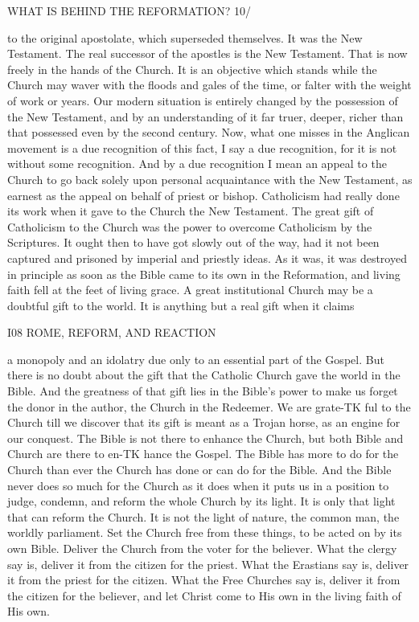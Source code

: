 \documentclass[12pt,a5paper,twoside]{book}
\begin{document}
WHAT IS BEHIND THE REFORMATION? 10/ 

to the original apostolate, which superseded themselves. 
It was the New Testament. The real successor of the 
apostles is the New Testament. That is now freely in 
the hands of the Church. It is an objective which 
stands while the Church may waver with the floods 
and gales of the time, or falter with the weight of 
work or years. Our modern situation is entirely 
changed by the possession of the New Testament, 
and by an understanding of it far truer, deeper, richer 
than that possessed even by the second century. 
Now, what one misses in the Anglican movement is a 
due recognition of this fact, I say a due recognition, 
for it is not without some recognition. And by a due 
recognition I mean an appeal to the Church to go 
back solely upon personal acquaintance with the New 
Testament, as earnest as the appeal on behalf of priest 
or bishop. Catholicism had really done its work 
when it gave to the Church the New Testament. The 
great gift of Catholicism to the Church was the power 
to overcome Catholicism by the Scriptures. It ought 
then to have got slowly out of the way, had it not been 
captured and prisoned by imperial and priestly ideas. 
As it was, it was destroyed in principle as soon as 
the Bible came to its own in the Reformation, and 
living faith fell at the feet of living grace. A great 
institutional Church may be a doubtful gift to the 
world. It is anything but a real gift when it claims 



I08 ROME, REFORM, AND REACTION 

a monopoly and an idolatry due only to an essential 
part of the Gospel. But there is no doubt about the 
gift that the Catholic Church gave the world in the 
Bible. And the greatness of that gift lies in the 
Bible's power to make us forget the donor in the 
author, the Church in the Redeemer. We are grate-TK
ful to the Church till we discover that its gift is 
meant as a Trojan horse, as an engine for our 
conquest. The Bible is not there to enhance the 
Church, but both Bible and Church are there to en-TK
hance the Gospel. The Bible has more to do for the 
Church than ever the Church has done or can do for 
the Bible. And the Bible never does so much for the 
Church as it does when it puts us in a position to 
judge, condemn, and reform the whole Church by 
its light. It is only that light that can reform the 
Church. It is not the light of nature, the common 
man, the worldly parliament. Set the Church free 
from these things, to be acted on by its own Bible. 
Deliver the Church from the voter for the believer. 
What the clergy say is, deliver it from the citizen for 
the priest. What the Erastians say is, deliver it from 
the priest for the citizen. What the Free Churches 
say is, deliver it from the citizen for the believer, and 
let Christ come to His own in the living faith of 
His own. 
\end{document}
